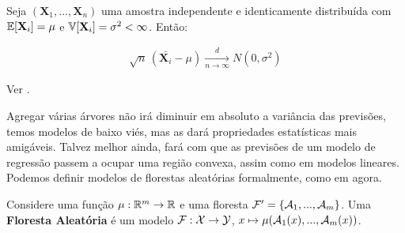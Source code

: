 \begin{teo}
Seja $(\textbf{X}_1, ..., \textbf{X}_n)$ uma amostra independente e identicamente distribuída com $\mathbb{E}[\textbf{X}_i] = \mu$ e $\mathbb{V}[\textbf{X}_i] = \sigma^2 < \infty$. Então:

\begin{align}
    \sqrt{n}\,(\bar{\textbf{X}_i }- \mu) \xrightarrow[n \to \infty]{d} N(0, \sigma^2)
\end{align}

\end{teo}

\begin{prova}
Ver .
\end{prova}

Agregar várias árvores não irá diminuir em absoluto a variância das previsões, temos modelos de baixo viés, mas as dará propriedades estatísticas mais amigáveis. Talvez melhor ainda, fará com que as previsões de um modelo de regressão passem a ocupar uma região convexa, assim como em modelos lineares. Podemos definir modelos de florestas aleatórias formalmente, como em  agora.

\begin{defi}
Considere uma função $\mu : \mathbb{R}^m \to \mathbb{R}$ e uma floresta $\mathcal{F}' = \{\mathcal{A}_1, ..., \mathcal{A}_m\}$. Uma \textbf{Floresta Aleatória} é um modelo $\mathcal{F} : \mathcal{X} \to \mathcal{Y}$,  $x \mapsto \mu(\mathcal{A}_1(x), ..., \mathcal{A}_m(x))$. 
\end{defi}
















  
  
